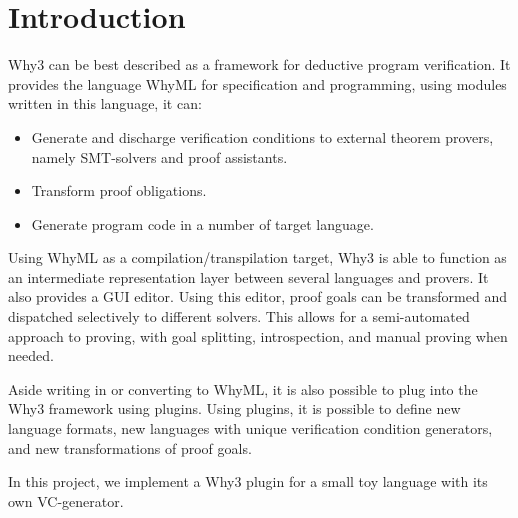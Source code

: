 \section{Introduction} %

Why3\cite{why3} can be best described as a framework for deductive program verification.
It provides the language WhyML for specification and programming,
using modules written in this language, it can:
\begin{itemize}
    \item Generate and discharge verification conditions to external theorem provers,
        namely SMT-solvers and proof assistants.
    \item Transform proof obligations.
    \item Generate program code in a number of target language.
\end{itemize}

Using WhyML as a compilation/transpilation target,
Why3 is able to function as an intermediate representation layer
between several languages and provers.
It also provides a GUI editor.
Using this editor, proof goals can be transformed and dispatched selectively to different solvers.
This allows for a semi-automated approach to proving,
with goal splitting, introspection, and manual proving when needed.

Aside writing in or converting to WhyML,
it is also possible to plug into the Why3 framework using plugins.
Using plugins, it is possible to define new language formats,
new languages with unique verification condition generators,
and new transformations of proof goals.

In this project, we implement a Why3 plugin for a small toy language
with its own VC-generator.
